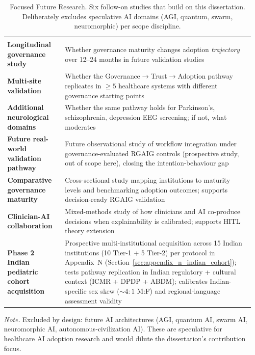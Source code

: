 {\tablestripes\tablefontsize
\begin{xltabular}{\textwidth}{@{} >{\raggedright\arraybackslash}p{3.0cm} L @{}}
\caption[Focused Future Research]{Focused Future Research. Six follow-on studies that build on this dissertation. Deliberately excludes speculative AI domains (AGI, quantum, swarm, neuromorphic) per scope discipline.}\label{tab:ch5_future_work} \\
\toprule
{} &  \\
\midrule
\endfirsthead
\toprule
{} &  \\
\midrule
\endhead
\bottomrule
\endlastfoot
\textbf{Longitudinal governance study}      & Whether governance maturity changes adoption \emph{trajectory} over 12--24 months in future validation studies \\
\textbf{Multi-site validation}              & Whether the Governance$\to$Trust$\to$Adoption pathway replicates in $\geq 5$ healthcare systems with different governance starting points \\
\textbf{Additional neurological domains}    & Whether the same pathway holds for Parkinson's, schizophrenia, depression EEG screening; if not, what moderates \\
\textbf{Future real-world validation pathway}   & Future observational study of workflow integration under governance-evaluated RGAIG controls (prospective study, out of scope here), closing the intention-behaviour gap \\
\textbf{Comparative governance maturity}    & Cross-sectional study mapping institutions to maturity levels and benchmarking adoption outcomes; supports decision-ready RGAIG validation \\
\textbf{Clinician-AI collaboration}         & Mixed-methods study of how clinicians and AI co-produce decisions when explainability is calibrated; supports HITL theory extension \\
\textbf{Phase 2 Indian pediatric cohort acquisition} & Prospective multi-institutional acquisition across 15 Indian institutions (10 Tier-1 + 5 Tier-2) per protocol in Appendix~N (Section~\ref{sec:appendix_n_indian_cohort}); tests pathway replication in Indian regulatory + cultural context (ICMR + DPDP + ABDM); calibrates Indian-specific sex skew ($\sim 4:1$ M:F) and regional-language assessment validity \\
\end{xltabular}}
\vspace{0.4em}
\noindent\textit{Note.} Excluded by design: future AI architectures (AGI, quantum AI, swarm AI, neuromorphic AI, autonomous-civilization AI). These are speculative for healthcare AI adoption research and would dilute the dissertation's contribution focus.

